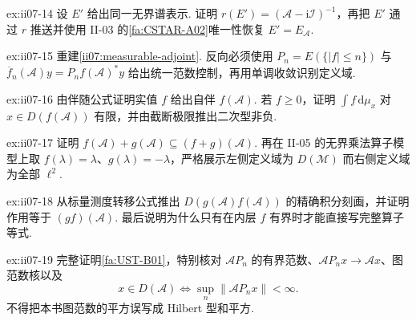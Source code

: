 \begin{FAExercise}[投影值测度唯一性]{ex:ii07-14}
设 \(\displaystyle E'\) 给出同一无界谱表示. 证明 \(\displaystyle r(E')=(\mathcal A-\mathrm{i}\mathcal I)^{-1}\)，再把 \(\displaystyle E'\) 通过 \(\displaystyle r\) 推送并使用 II-03 的\autoref{fa:CSTAR-A02}唯一性恢复 \(\displaystyle E'=E_{\mathcal A}\).
\end{FAExercise}

\begin{FAExercise}[可测函数演算的伴随两方向]{ex:ii07-15}
重建\autoref{ii07:measurable-adjoint}. 反向必须使用 \(\displaystyle P_n=E(\{|f|\leqslant n\})\) 与
\(\displaystyle \overline f_n(\mathcal A)y=P_nf(\mathcal A)^*y\)
给出统一范数控制，再用单调收敛识别定义域.
\end{FAExercise}

\begin{FAExercise}[实值自伴与非负函数正性]{ex:ii07-16}
由伴随公式证明实值 \(\displaystyle f\) 给出自伴 \(\displaystyle f(\mathcal A)\). 若 \(\displaystyle f\geqslant0\)，证明 \(\displaystyle\int f\,\mathrm{d}\mu_x\) 对 \(\displaystyle x\in D(f(\mathcal A))\) 有限，并由截断极限推出二次型非负.
\end{FAExercise}

\begin{FAExercise}[和的定义域不能无条件相等]{ex:ii07-17}
证明 \(\displaystyle f(\mathcal A)+g(\mathcal A)\subseteq(f+g)(\mathcal A)\). 再在 II-05 的无界乘法算子模型上取 \(\displaystyle f(\lambda)=\lambda\)、\(\displaystyle g(\lambda)=-\lambda\)，严格展示左侧定义域为 \(\displaystyle D(\mathcal M)\) 而右侧定义域为全部 \(\displaystyle\ell^2\).
\end{FAExercise}

\begin{FAExercise}[积的精确定义域与有界内层特例]{ex:ii07-18}
从标量测度转移公式推出 \(\displaystyle D(g(\mathcal A)f(\mathcal A))\) 的精确积分刻画，并证明作用等于 \(\displaystyle(gf)(\mathcal A)\). 最后说明为什么只有在内层 \(\displaystyle f\) 有界时才能直接写完整算子等式.
\end{FAExercise}

\begin{FAExercise}[自伴谱测度的定义域刻画与谱截断图范数核]{ex:ii07-19}
完整证明\autoref{fa:UST-B01}，特别核对 \(\displaystyle\mathcal AP_n\) 的有界范数、\(\displaystyle\mathcal AP_nx\to\mathcal Ax\)、图范数核以及
\[
x\in D(\mathcal A)
\iff
\sup_n\|\mathcal AP_nx\|<\infty.
\]
不得把本书图范数的平方误写成 Hilbert 型和平方.
\end{FAExercise}

